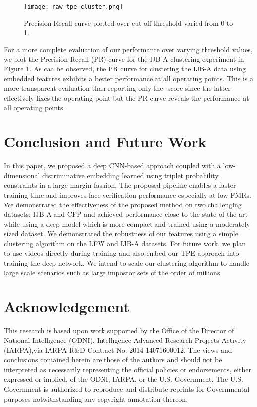 \documentclass[10pt,twocolumn,letterpaper]{article}
\begin{document}
\begin{figure}
  \centering
  \texttt{[image: raw\_tpe\_cluster.png]}
  \caption{Precision-Recall curve plotted over cut-off threshold varied from 0 to 1.}
  \label{fig:pr_curve}
\end{figure}
 
For a more complete evaluation of our performance over varying threshold values, we plot the Precision-Recall (PR) curve for the IJB-A clustering experiment in Figure \ref{fig:pr_curve}. As can be observed, the PR curve for clustering the IJB-A data using embedded features exhibits a better performance at all operating points. This is a more transparent evaluation than reporting only the -score since the latter effectively fixes the operating point but the PR curve reveals the performance at all operating points.  \section{Conclusion and Future Work}\label{conclusion}
In this paper, we proposed a deep CNN-based approach coupled with a
low-dimensional discriminative embedding learned using triplet probability
constraints in a large margin fashion. The proposed pipeline enables a faster
training time and improves face verification performance especially at low
FMRs. We demonstrated the effectiveness of the proposed method on two
challenging datasets: IJB-A and CFP and achieved performance close to
the state of the art while using a deep model which is more compact and trained
using a moderately sized dataset. We demonstrated the robustness of our features
using a simple clustering algorithm on the LFW and IJB-A datasets. For future
work, we plan to use videos directly during training and also embed our TPE
approach into training the deep network. We intend to scale our clustering
algorithm to handle large scale scenarios such as large impostor sets of the
order of millions. 
 \section{Acknowledgement}\label{sec:ackno}
This research is based upon work supported by the Office of the Director of National Intelligence (ODNI), Intelligence Advanced Research Projects Activity (IARPA),via IARPA R\&D Contract No. 2014-14071600012.  The views and conclusions contained herein are those of the authors and should not be interpreted as necessarily representing the official policies or endorsements, either expressed or implied, of the ODNI, IARPA, or the U.S. Government. The U.S. Government is authorized to reproduce and distribute reprints for Governmental purposes notwithstanding any copyright annotation thereon. 


\end{document}
